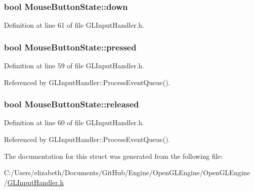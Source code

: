\subsubsection[{\texorpdfstring{down}{down}}]{\setlength{\rightskip}{0pt plus 5cm}bool Mouse\+Button\+State\+::down}\hypertarget{struct_mouse_button_state_a6aa2ac9258c9919903ace5772abd38d0}{}\label{struct_mouse_button_state_a6aa2ac9258c9919903ace5772abd38d0}


Definition at line 61 of file G\+L\+Input\+Handler.\+h.

\subsubsection[{\texorpdfstring{pressed}{pressed}}]{\setlength{\rightskip}{0pt plus 5cm}bool Mouse\+Button\+State\+::pressed}\hypertarget{struct_mouse_button_state_ae428b125228d89509b7cd0252de7afc8}{}\label{struct_mouse_button_state_ae428b125228d89509b7cd0252de7afc8}


Definition at line 59 of file G\+L\+Input\+Handler.\+h.



Referenced by G\+L\+Input\+Handler\+::\+Process\+Event\+Queue().

\subsubsection[{\texorpdfstring{released}{released}}]{\setlength{\rightskip}{0pt plus 5cm}bool Mouse\+Button\+State\+::released}\hypertarget{struct_mouse_button_state_a229af718ec1b3105452ecb237f35d502}{}\label{struct_mouse_button_state_a229af718ec1b3105452ecb237f35d502}


Definition at line 60 of file G\+L\+Input\+Handler.\+h.



Referenced by G\+L\+Input\+Handler\+::\+Process\+Event\+Queue().



The documentation for this struct was generated from the following file\+:\begin{DoxyCompactItemize}
\item 
C\+:/\+Users/elizabeth/\+Documents/\+Git\+Hub/\+Engine/\+Open\+G\+L\+Engine/\+Open\+G\+L\+Engine/\hyperlink{_g_l_input_handler_8h}{G\+L\+Input\+Handler.\+h}\end{DoxyCompactItemize}
